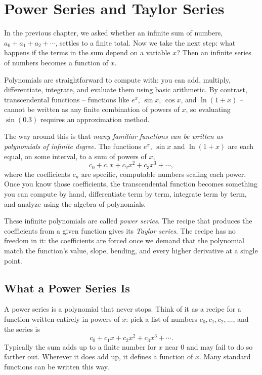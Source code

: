 \chapter{Power Series and Taylor Series}

In the previous chapter, we asked whether an infinite sum of numbers, $a_0 + a_1 + a_2 + \cdots$, settles to a finite total. Now we take the next step: what happens if the terms in the sum depend on a variable $x$? Then an infinite series of numbers becomes a function of $x$.

Polynomials are straightforward to compute with: you can add, multiply, differentiate, integrate, and evaluate them using basic arithmetic. By contrast, transcendental functions -- functions like $e^x$, $\sin x$, $\cos x$, and $\ln(1+x)$ -- cannot be written as any finite combination of powers of $x$, so evaluating $\sin(0.3)$ requires an approximation method.

The way around this is that \emph{many familiar functions can be written as polynomials of infinite degree.} The functions $e^x$, $\sin x$ and $\ln(1+x)$ are each equal, on some interval, to a sum of powers of $x$,
\[
  c_0 + c_1 x + c_2 x^2 + c_3 x^3 + \cdots,
\]
where the coefficients $c_n$ are specific, computable numbers scaling each power. Once you know those coefficients, the transcendental function becomes something you can compute by hand, differentiate term by term, integrate term by term, and analyze using the algebra of polynomials.

These infinite polynomials are called \emph{power series}. The recipe that produces the coefficients from a given function gives its \emph{Taylor series}. The recipe has no freedom in it: the coefficients are forced once we demand that the polynomial match the function's value, slope, bending, and every higher derivative at a single point.

\section{What a Power Series Is}
\label{ch30:sec-what}

\begin{intuitionbox}
A power series is a polynomial that never stops. Think of it as a recipe for a function written entirely in powers of $x$: pick a list of numbers $c_0, c_1, c_2, \dots$, and the series is
\[
  c_0 + c_1 x + c_2 x^2 + c_3 x^3 + \cdots.
\]
Typically the sum adds up to a finite number for $x$ near $0$ and may fail to do so farther out. Wherever it does add up, it defines a function of $x$. Many standard functions can be written this way.
\end{intuitionbox}

